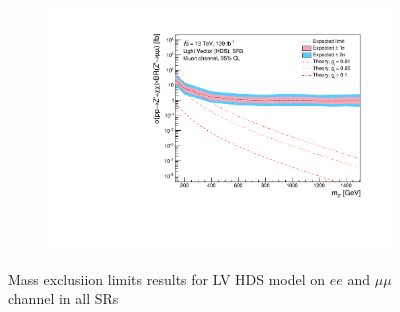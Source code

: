 \documentclass[12pt, a4paper]{book}
\begin{document}
\begin{figure}[!ht]
\begin{subfigure}[b]{0.49\textwidth}
   \end{subfigure}
   \hfill
   \begin{subfigure}[b]{0.49\textwidth}
      \centering
      \includegraphics[width=1\textwidth]{Limits/Model_independent/150/LV_HDS/mass_exclusion_uu.pdf}
   \end{subfigure}
   \caption{Mass exclusiion limits results for LV HDS model on $ee$ and $\mu\mu$ channel in all SRs}\label{fig:LV_HDS_me_SRS}
\end{figure}
\end{document}
